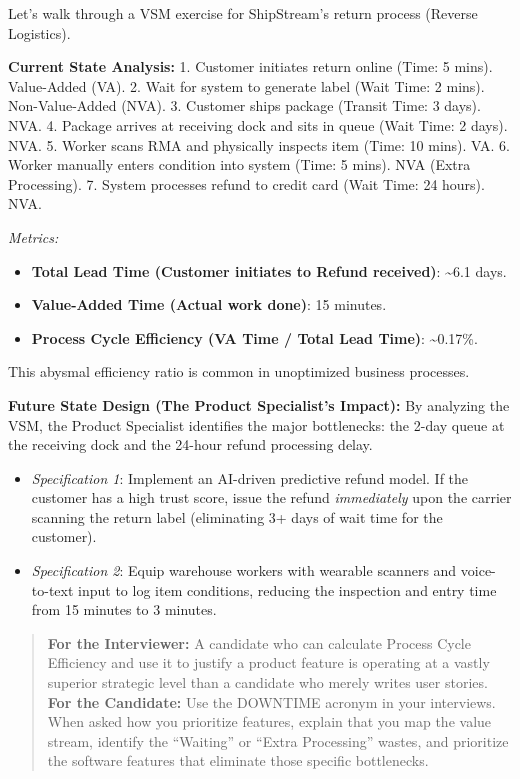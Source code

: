 Let's walk through a VSM exercise for ShipStream's return process
(Reverse Logistics).

\textbf{Current State Analysis:} 1. Customer initiates return online
(Time: 5 mins). Value-Added (VA). 2. Wait for system to generate label
(Wait Time: 2 mins). Non-Value-Added (NVA). 3. Customer ships package
(Transit Time: 3 days). NVA. 4. Package arrives at receiving dock and
sits in queue (Wait Time: 2 days). NVA. 5. Worker scans RMA and
physically inspects item (Time: 10 mins). VA. 6. Worker manually enters
condition into system (Time: 5 mins). NVA (Extra Processing). 7. System
processes refund to credit card (Wait Time: 24 hours). NVA.

\emph{Metrics:}

\begin{itemize}
\tightlist
\item
  \textbf{Total Lead Time (Customer initiates to Refund received)}:
  \textasciitilde6.1 days.
\item
  \textbf{Value-Added Time (Actual work done)}: 15 minutes.
\item
  \textbf{Process Cycle Efficiency (VA Time / Total Lead Time)}:
  \textasciitilde0.17\%.
\end{itemize}

This abysmal efficiency ratio is common in unoptimized business
processes.

\textbf{Future State Design (The Product Specialist's Impact):} By
analyzing the VSM, the Product Specialist identifies the major
bottlenecks: the 2-day queue at the receiving dock and the 24-hour
refund processing delay.

\begin{itemize}
\tightlist
\item
  \emph{Specification 1}: Implement an AI-driven predictive refund
  model. If the customer has a high trust score, issue the refund
  \emph{immediately} upon the carrier scanning the return label
  (eliminating 3+ days of wait time for the customer).
\item
  \emph{Specification 2}: Equip warehouse workers with wearable scanners
  and voice-to-text input to log item conditions, reducing the
  inspection and entry time from 15 minutes to 3 minutes.
\end{itemize}

\begin{quote}
\textbf{For the Interviewer:} A candidate who can calculate Process
Cycle Efficiency and use it to justify a product feature is operating at
a vastly superior strategic level than a candidate who merely writes
user stories. \textbf{For the Candidate:} Use the DOWNTIME acronym in
your interviews. When asked how you prioritize features, explain that
you map the value stream, identify the ``Waiting'' or ``Extra
Processing'' wastes, and prioritize the software features that eliminate
those specific bottlenecks.
\end{quote}

